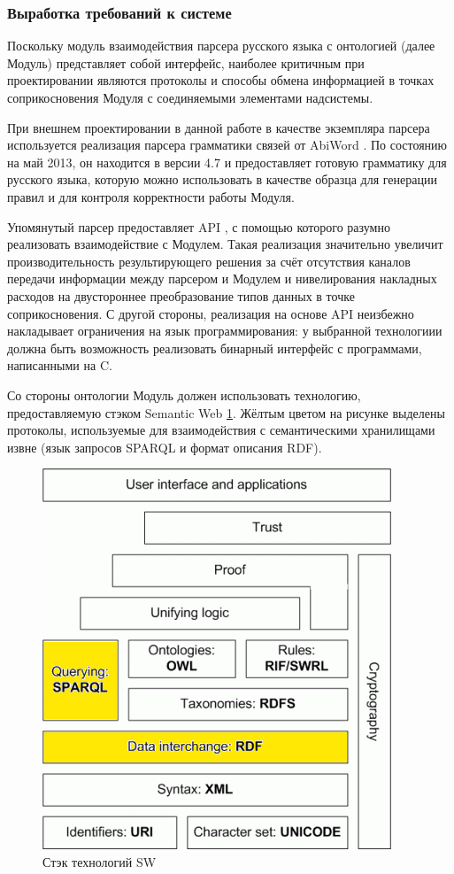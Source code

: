 \subsubsection{Выработка требований к системе}

Поскольку модуль взаимодействия парсера русского языка с онтологией (далее Модуль) представляет собой интерфейс, наиболее критичным при проектировании являются протоколы и способы обмена информацией в точках соприкосновения Модуля с соединяемыми элементами надсистемы.

При внешнем проектировании в данной работе в качестве экземпляра парсера используется реализация парсера грамматики связей от AbiWord \cite{abiparser}. По состоянию на май 2013, он находится в версии 4.7 и предоставляет готовую грамматику для русского языка, которую можно использовать в качестве образца для генерации правил и для контроля корректности работы Модуля.

Упомянутый парсер предоставляет API \cite{api}, с помощью которого разумно реализовать взаимодействие с Модулем. Такая реализация значительно увеличит производительность результирующего решения за счёт отсутствия каналов передачи информации между парсером и Модулем и нивелирования накладных расходов на двустороннее преобразование типов данных в точке соприкосновения. С другой стороны, реализация на основе API неизбежно накладывает ограничения на язык программирования: у выбранной технологиии должна быть возможность реализовать бинарный интерфейс с программами, написанными на C.

Со стороны онтологии Модуль должен использовать технологию, предоставляемую стэком Semantic Web \ref{fig:swstack}. Жёлтым цветом на рисунке выделены протоколы, используемые для взаимодействия с семантическими хранилищами извне (язык запросов SPARQL и формат описания RDF). 

\begin{figure}[H]
	\centering
		\includegraphics[scale=1.0]{images/swstack.png}
	\caption{\small Стэк технологий SW}
	\label{fig:swstack}
\end{figure} 

